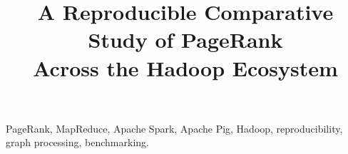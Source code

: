 \documentclass[conference]{IEEEtran}
\begin{document}
\title{A Reproducible Comparative Study of PageRank\\ Across the Hadoop Ecosystem}

\author{
}

\maketitle

\begin{abstract}

\end{abstract}

\begin{IEEEkeywords}
PageRank, MapReduce, Apache Spark, Apache Pig, Hadoop, reproducibility,
graph processing, benchmarking.
\end{IEEEkeywords}


\end{document}
